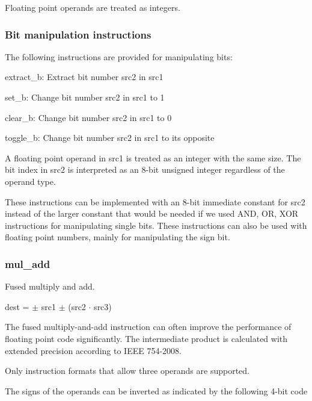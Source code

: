 \documentclass[forwardcom.tex]{subfiles}
\begin{document}
Floating point operands are treated
as integers.


\subsubsection{Bit manipulation instructions}
The following instructions are provided for manipulating bits: 
\vspace{2mm}

extract\_b: Extract bit number src2 in src1

set\_b: Change bit number src2 in src1 to 1

clear\_b: Change bit number src2 in src1 to 0

toggle\_b: Change bit number src2 in src1 to its opposite
\vspace{2mm}

A floating point operand in src1 is treated as an integer with the same size. The bit index in src2 is interpreted as an 8-bit unsigned integer regardless of the operand type.
\vspace{2mm}

These instructions can be implemented with an 8-bit immediate constant for src2 instead of the larger constant that would be needed if we used AND, OR, XOR instructions for manipulating single bits. These instructions can also be used with floating point numbers, mainly for manipulating the sign bit.

\subsubsection{mul\_add}  \label{mulAdd}
Fused multiply and add.
\vspace{2mm}

dest = $\pm$ src1 $\pm$ (src2 $\cdot$ src3)
\vspace{2mm}

The fused multiply-and-add instruction can often improve the performance of floating point code significantly. The intermediate product is calculated with extended precision according to IEEE 754-2008.
\vspace{2mm}

Only instruction formats that allow three operands are supported.
\vspace{2mm}

The signs of the operands can be inverted as indicated by the following 4-bit code
\end{document}
